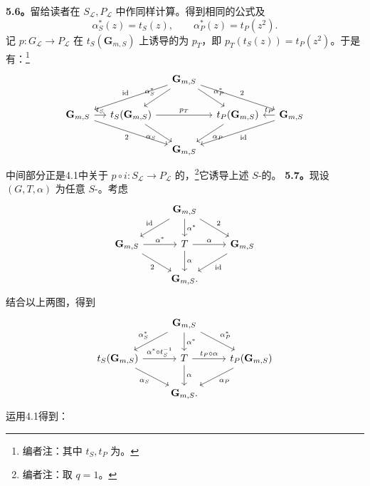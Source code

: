 \textbf{5.6。}留给读者在 $S_{\mathscr L},P_{\mathscr L}$ 中作同样计算。得到相同的公式及
\[\alpha_S^*(z)=t_S(z),\qquad\alpha_P^*(z)=t_P(z^2).\]
记 $p:G_{\mathscr L}\to P_{\mathscr L}$ 在 $t_S(\mathbf G_{m,S})$ 上诱导的为 $p_T$，即 $p_T(t_S(z))=t_P(z^2)$。于是有：\footnote{编者注：其中 $t_S,t_P$ 为。}
\[\begin{tikzcd}[column sep=small]& &\mathbf G_{m,S}\arrow[dll,"\mathrm{id}"']\arrow[dl,"\alpha_S^*"']\arrow[dr,"\alpha_P^*"]\arrow[drr,"2"]&&\\\mathbf G_{m,S}\arrow[r,"t_S"]\arrow[drr,"2"']&t_S(\mathbf G_{m,S})\arrow[rr,"p_T"]\arrow[dr,"\alpha_S"']&&t_P(\mathbf G_{m,S})\arrow[dl,"\alpha_P"]&\mathbf G_{m,S}\arrow[l,"t_P"']\arrow[dll,"\mathrm{id}"]\\&&\mathbf G_{m,S}&&\end{tikzcd}\]
中间部分正是4.1中关于 $p\circ i:S_{\mathscr L}\to P_{\mathscr L}$ 的，\footnote{编者注：取 $q=1$。}它诱导上述 $S$-的。
\textbf{5.7。}现设 $(G,T,\alpha)$ 为任意 $S$-。考虑
\[\begin{tikzcd}&\mathbf G_{m,S}\arrow[dl,"\mathrm{id}"']\arrow[d,"\alpha^*"]\arrow[dr,"2"]&\\\mathbf G_{m,S}\arrow[r,"\alpha^*"]\arrow[dr,"2"']&T\arrow[r,"\alpha"]\arrow[d,"\alpha"]&\mathbf G_{m,S}\arrow[dl,"\mathrm{id}"]\\&\mathbf G_{m,S}.&\end{tikzcd}\]
结合以上两图，得到
\[\begin{tikzcd}&\mathbf G_{m,S}\arrow[dl,"\alpha_S^*"']\arrow[d,"\alpha^*"]\arrow[dr,"\alpha_P^*"]&\\t_S(\mathbf G_{m,S})\arrow[r,"\alpha^*\circ t_S^{-1}"]\arrow[dr,"\alpha_S"']&T\arrow[r,"t_P\circ\alpha"]\arrow[d,"\alpha"]&t_P(\mathbf G_{m,S})\arrow[dl,"\alpha_P"]\\&\mathbf G_{m,S}.&\end{tikzcd}\]
运用4.1得到：
